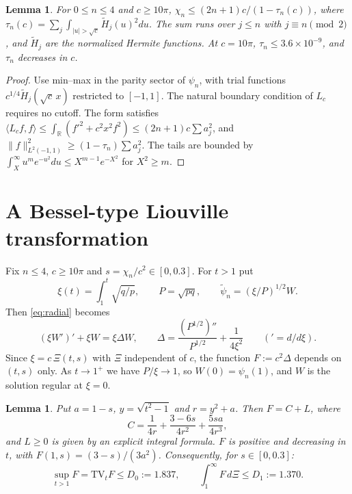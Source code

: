 \documentclass[11pt]{amsart}
\newtheorem{lemma}[proposition]{Lemma}
\theoremstyle{remark}
\numberwithin{equation}{section}
\newcommand{\R}{\mathbb{R}}
\begin{document}
\begin{lemma}\label{lem:chi}
For $0\le n\le4$ and $c\ge10\pi$, $\chi_n\le(2n+1)c/(1-\tau_n(c))$, where $\tau_n(c)=\sum_{j}\int_{|u|>\sqrt c}\tilde H_j(u)^2du$. The sum runs over $j\le n$ with $j\equiv n\pmod 2$, and $\tilde H_j$ are the normalized Hermite functions. At $c=10\pi$, $\tau_n\le3.6\times10^{-9}$, and $\tau_n$ decreases in $c$.
\end{lemma}
\begin{proof}
Use min--max in the parity sector of $\psi_n$, with trial functions $c^{1/4}\tilde H_j(\sqrt c\,x)$ restricted to $[-1,1]$. The natural boundary condition of $L_c$ requires no cutoff. The form satisfies $\langle L_cf,f\rangle\le\int_\R(f'^2+c^2x^2f^2)\le(2n+1)c\sum a_j^2$, and $\|f\|_{L^2(-1,1)}^2\ge(1-\tau_n)\sum a_j^2$. The tails are bounded by $\int_X^\infty u^me^{-u^2}du\le X^{m-1}e^{-X^2}$ for $X^2\ge m$.
\end{proof}

\section{A Bessel-type Liouville transformation}\label{sec:liouville}

Fix $n\le4$, $c\ge10\pi$ and $s=\chi_n/c^2\in[0,0.3]$. For $t>1$ put
\[
\xi(t)=\int_1^t\sqrt{q/p},\qquad P=\sqrt{pq},\qquad\tilde\psi_n=(\xi/P)^{1/2}W.
\]
Then \eqref{eq:radial} becomes
\begin{equation}\label{eq:bessel}
(\xi W')'+\xi W=\xi\Delta W,\qquad\Delta=\frac{(P^{1/2})''}{P^{1/2}}+\frac1{4\xi^2}\qquad({}'=d/d\xi).
\end{equation}
Since $\xi=c\,\Xi(t,s)$ with $\Xi$ independent of $c$, the function $F:=c^2\Delta$ depends on $(t,s)$ only. As $t\to1^+$ we have $P/\xi\to1$, so $W(0)=\psi_n(1)$, and $W$ is the solution regular at $\xi=0$.

\begin{lemma}\label{lem:F}
Put $a=1-s$, $y=\sqrt{t^2-1}$ and $r=y^2+a$. Then $F=C+L$, where
\[
C=\frac1{4r}+\frac{3-6s}{4r^2}+\frac{5sa}{4r^3},
\]
and $L\ge0$ is given by an explicit integral formula. $F$ is positive and decreasing in $t$, with $F(1,s)=(3-s)/(3a^2)$. Consequently, for $s\in[0,0.3]$:
\[
\sup_{t>1}F=\mathrm{TV}_tF\le D_0:=1.837,\qquad\int_1^\infty F\,d\Xi\le D_1:=1.370.
\]
\end{lemma}
\end{document}

